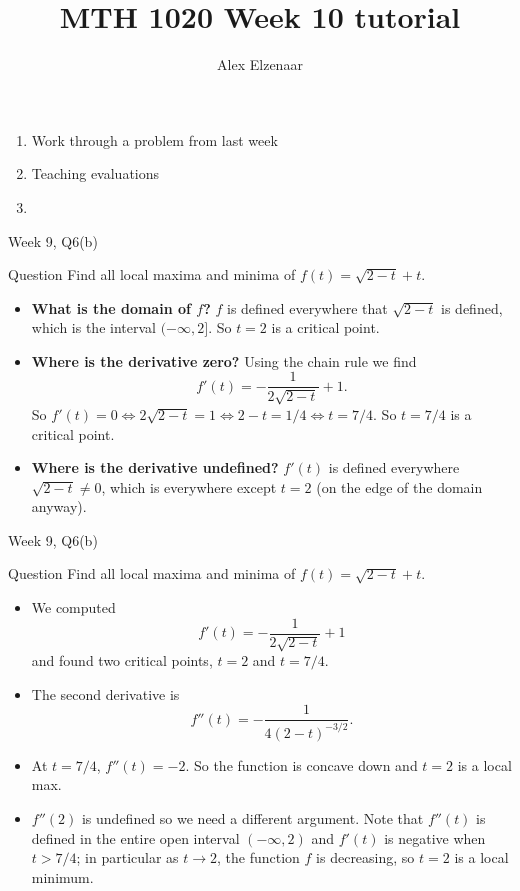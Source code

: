 \documentclass{beamer}
\title{MTH 1020 Week 10 tutorial}
\author{Alex Elzenaar}
\begin{document}
\begin{frame}{\inserttitle}
\begin{enumerate}
  \item Work through a problem from last week
  \item Teaching evaluations
  \item
\end{enumerate}
\end{frame}


\begin{frame}{Week 9, Q6(b)}
  \begin{block}{Question}
    Find all local maxima and minima of $ f(t) = \sqrt{2-t} + t $.
  \end{block}

  \begin{itemize}
    \item \textbf{What is the domain of $ f $?}
    $f$ is defined everywhere that $ \sqrt{2-t} $ is defined, which is the interval $ (-\infty,2] $. So $ t = 2 $ is a critical point.
    \item \textbf{Where is the derivative zero?}
    Using the chain rule we find
    \begin{displaymath}
      f'(t) = -\frac{1}{2\sqrt{2-t}} + 1.
    \end{displaymath}
    So $ f'(t) = 0 \iff 2\sqrt{2-t} = 1 \iff 2-t = 1/4 \iff t = 7/4 $. So $ t = 7/4 $ is a critical point.
    \item \textbf{Where is the derivative undefined?}
    $f'(t) $ is defined everywhere $ \sqrt{2-t} \neq 0 $, which is everywhere except $ t = 2 $ (on the edge of the domain anyway).
  \end{itemize}
\end{frame}


\begin{frame}{Week 9, Q6(b)}
  \begin{block}{Question}
    Find all local maxima and minima of $ f(t) = \sqrt{2-t} + t $.
  \end{block}
  \begin{itemize}
    \item We computed
          \begin{displaymath}
            f'(t) = -\frac{1}{2\sqrt{2-t}} + 1
          \end{displaymath}
          and found two critical points, $ t = 2 $ and $ t = 7/4 $.
    \item The second derivative is
    \begin{displaymath}
      f''(t) = -\frac{1}{4 (2-t)^{-3/2}}.
    \end{displaymath}
    \item At $ t = 7/4 $, $ f''(t) = -2 $. So the function is concave down and $ t=2 $ is a local max.
    \item $ f''(2)$ is undefined so we need a different argument. Note that $ f''(t) $ is defined in the
            entire open interval $ (-\infty,2) $ and $ f'(t) $ is negative when $ t > 7/4 $; in particular
            as $ t \to 2 $, the function $ f $ is decreasing, so $ t=2 $ is a local minimum.
  \end{itemize}
\end{frame}
\end{document}

